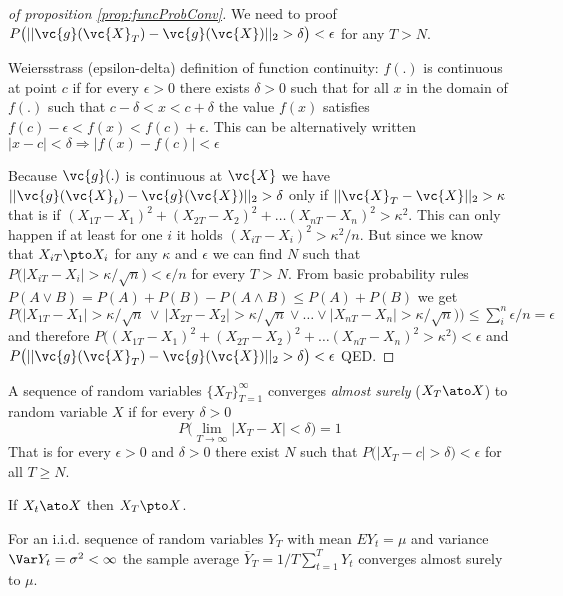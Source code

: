 \begin{proof}[of proposition \ref{prop:funcProbConv}] We need to proof $P\big(||\vc{g}(\vc{X}_T) -\vc{g}(\vc{X})||_2 > \delta \big) <\epsilon$ for any $T > N$.

Weiersstrass (epsilon-delta) definition of function continuity: $f(.)$ is continuous at point $c$ if for every $\epsilon > 0$ there exists $\delta > 0$ such that for all $x$ in the domain of $f(.)$ such that $c - \delta < x < c + \delta$ the value $f(x)$ satisfies $f(c) - \epsilon < f(x) < f(c) + \epsilon$.
This can be alternatively written $|x-c| < \delta \Rightarrow |f(x) - f(c)| < \epsilon$

Because $\vc{g}(.)$ is continuous at $\vc{X}$ we have $||\vc{g}(\vc{X}_t) - \vc{g}(\vc{X})||_2 > \delta$ only if $||\vc{X}_T - \vc{X}||_2 > \kappa$ that is if $(X_{1T} - X_1)^2 + (X_{2T} - X_2)^2 + \ldots (X_{nT} - X_n)^2 > \kappa^2$.
This can only happen if at least for one $i$ it holds $(X_{iT} - X_i)^2 > \kappa^2/n$.
But since we know that $X_{iT} \pto X_i$ for any $\kappa$ and $\epsilon$ we can find $N$ such that $P\big(|X_{iT} - X_i| > \kappa/\sqrt{n} \big) <\epsilon/n$ for every $T > N$.
From basic probability rules $P(A \vee B) = P(A) + P(B) - P(A \wedge B) \le P(A) + P(B)$ we get
$ P\big(|X_{1T} - X_1| > \kappa/\sqrt{n} \, \vee \, |X_{2T} - X_2| > \kappa/\sqrt{n} \vee \ldots
\vee |X_{nT} - X_n| > \kappa/\sqrt{n} \big) \Big) \leq \sum_i^n \epsilon/n = \epsilon$ and therefore
$P\big((X_{1T} - X_1)^2 + (X_{2T} - X_2)^2 + \ldots (X_{nT} - X_n)^2 > \kappa^2 \big) < \epsilon$ and $P\big(||\vc{g}(\vc{X}_T) -\vc{g}(\vc{X})||_2 > \delta \big) <\epsilon$ QED.
\end{proof}

\begin{definition}
A sequence of random variables $\{X_T\}_{T=1}^{\infty}$ converges \emph{almost surely} ($X_T \ato X$) to random variable $X$ if  for every $\delta > 0$
\begin{equation*}
P\big(\lim_{T \to \infty} |X_T - X| < \delta \big) = 1
\end{equation*}
That is for every $\epsilon > 0$ and $\delta > 0$ there exist $N$ such that $P\big(|X_T -c| > \delta \big) <\epsilon$ for all $T \ge N$.
\end{definition}
If $X_t \ato X$ then $X_T \pto X$.

\begin{theorem}\label{thm:StrongLawLargeNums}
For an i.i.d. sequence of random variables $Y_T$ with mean $E Y_t = \mu$ and variance $\Var Y_t = \sigma^2 < \infty$ the sample average $\bar{Y}_T = 1/T \sum_{t=1}^T Y_t$ converges almost surely to $\mu$.
\end{theorem}



